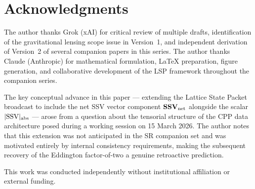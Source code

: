 \documentclass[12pt]{article}
\newcommand{\SSV}{\text{SSV}}
\begin{document}
\section*{Acknowledgments}

The author thanks Grok (xAI) for critical review of multiple drafts,
identification of the gravitational lensing scope issue in Version~1,
and independent derivation of Version~2 of several companion papers
in this series. The author thanks Claude (Anthropic) for mathematical
formulation, LaTeX preparation, figure generation, and collaborative
development of the LSP framework throughout the companion series.

The key conceptual advance in this paper --- extending the Lattice
State Packet broadcast to include the net SSV vector component
$\mathbf{SSV}_{\rm net}$ alongside the scalar $|\SSV|_{\rm abs}$ ---
arose from a question about the tensorial structure of the CPP data architecture posed during a working session on 15 March 2026. The author notes that this extension was not anticipated in the SR companion set and was motivated entirely by internal consistency requirements, making the subsequent recovery of the Eddington factor-of-two a genuine retroactive prediction.

This work was conducted independently without institutional affiliation or external funding.



\end{document}

